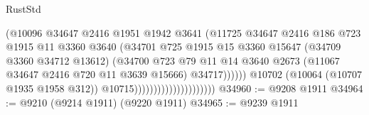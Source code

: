 \begin{lexlean}{RustStd}
\begin{coremodule}
                                                  (@10096
                                                    @34647
                                                    @2416
                                                    @1951
                                                    @1942
                                                    @3641
                                                    (@11725
                                                      @34647
                                                      @2416
                                                      @186
                                                      @723
                                                      @1915
                                                      @11
                                                      @3360
                                                      @3640
                                                      (@34701
                                                        @725
                                                        @1915
                                                        @15
                                                        @3360
                                                        @15647
                                                        (@34709 @3360 @34712 @13612)
                                                        (@34700
                                                          @723
                                                          @79
                                                          @11
                                                          @14
                                                          @3640
                                                          @2673
                                                          (@11067
                                                            @34647
                                                            @2416
                                                            @720
                                                            @11
                                                            @3639
                                                            @15666)
                                                          @34717))))))
                                              @10702
                                              (@10064 (@10707 @1935 @1958 @312))
                                              @10715)))))))))))))))))))))
@34960 := @9208 @1911
@34964 := @9210 (@9214 @1911) (@9220 @1911)
@34965 := @9239 @1911

\end{coremodule}
\end{lexlean}
